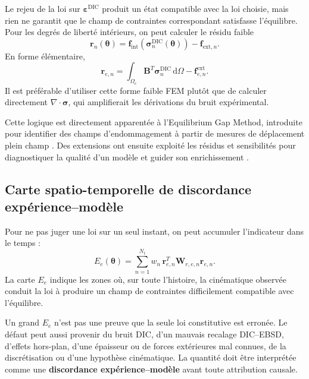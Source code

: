 \documentclass[11pt,a4paper]{article}
\newcommand{\epsdic}{\bm{\varepsilon}^{\mathrm{DIC}}}
\newcommand{\Req}{\bm{r}}
\begin{document}
Le rejeu de la loi sur $\epsdic$ produit un état compatible avec la loi choisie, mais rien ne garantit
que le champ de contraintes correspondant satisfasse l'équilibre. Pour les degrés de liberté
intérieurs, on peut calculer le résidu faible
\begin{equation}
  \Req_n(\bm{\theta})
  = \bm{f}_{\mathrm{int}}
  \left(\bm{\sigma}^{\mathrm{DIC}}_n(\bm{\theta})\right)
  - \bm{f}_{\mathrm{ext},n}.
  \label{eq:eqgap}
\end{equation}
En forme élémentaire,
\begin{equation}
  \bm{r}_{e,n}
  = \int_{\Omega_e} \bm{B}^T\bm{\sigma}^{\mathrm{DIC}}_n\,\mathrm{d}\Omega
  - \bm{f}_{e,n}^{\mathrm{ext}}.
\end{equation}
Il est préférable d'utiliser cette forme faible FEM plutôt que de calculer directement
$\nabla\!\cdot\!\bm{\sigma}$, qui amplifierait les dérivations du bruit expérimental.

Cette logique est directement apparentée à l'Equilibrium Gap Method, introduite pour identifier des
champs d'endommagement à partir de mesures de déplacement plein champ
\parencite{claire2004equilibrium}. Des extensions ont ensuite exploité les résidus et sensibilités
pour diagnostiquer la qualité d'un modèle et guider son enrichissement
\parencite{neggers2017enrichment}.

\subsection{Carte spatio-temporelle de discordance expérience--modèle}

Pour ne pas juger une loi sur un seul instant, on peut accumuler l'indicateur dans le temps :
\begin{equation}
  E_e(\bm{\theta})
  = \sum_{n=1}^{N_t} w_n\,
    \bm{r}_{e,n}^T\bm{W}_{r,e,n}\bm{r}_{e,n}.
  \label{eq:localcum}
\end{equation}
La carte $E_e$ indique les zones où, sur toute l'histoire, la cinématique observée conduit la loi à
produire un champ de contraintes difficilement compatible avec l'équilibre.

\begin{warningbox}
Un grand $E_e$ n'est pas une preuve que la seule loi constitutive est erronée. Le défaut peut aussi
provenir du bruit DIC, d'un mauvais recalage DIC--EBSD, d'effets hors-plan, d'une épaisseur ou de
forces extérieures mal connues, de la discrétisation ou d'une hypothèse cinématique. La quantité doit
être interprétée comme une \textbf{discordance expérience--modèle} avant toute attribution causale.
\end{warningbox}
\end{document}
